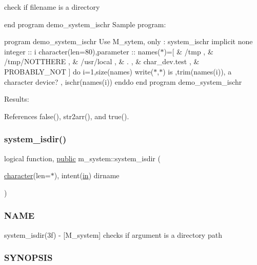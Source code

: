 check if filename is a directory

end program demo\+\_\+system\+\_\+ischr Sample program\+:

program demo\+\_\+system\+\_\+ischr Use M\+\_\+sytem, only \+: system\+\_\+ischr implicit none integer \+:\+: i character(len=80),parameter \+:\+: names($\ast$)=\mbox{[} \& \textquotesingle{}/tmp \textquotesingle{}, \& \textquotesingle{}/tmp/\+N\+O\+T\+T\+H\+E\+RE \textquotesingle{}, \& \textquotesingle{}/usr/local \textquotesingle{}, \& \textquotesingle{}. \textquotesingle{}, \& \textquotesingle{}char\+\_\+dev.\+test \textquotesingle{}, \& \textquotesingle{}P\+R\+O\+B\+A\+B\+L\+Y\+\_\+\+N\+OT \textquotesingle{}\mbox{]} do i=1,size(names) write($\ast$,$\ast$)\textquotesingle{} is \textquotesingle{},trim(names(i)),\textquotesingle{} a character device? \textquotesingle{}, ischr(names(i)) enddo end program demo\+\_\+system\+\_\+ischr

Results\+: 

References false(), str2arr(), and true().

\mbox{\label{namespacem__system_ad097988a031e64b4f21f856cf45c9c73}} 
\subsubsection{\texorpdfstring{system\+\_\+isdir()}{system\_isdir()}}
{\footnotesize\ttfamily logical function, \hyperlink{M__stopwatch_83_8txt_a2f74811300c361e53b430611a7d1769f}{public} m\+\_\+system\+::system\+\_\+isdir (\begin{DoxyParamCaption}\item[{\hyperlink{option__stopwatch_83_8txt_abd4b21fbbd175834027b5224bfe97e66}{character}(len=$\ast$), intent(\hyperlink{M__journal_83_8txt_afce72651d1eed785a2132bee863b2f38}{in})}]{dirname }\end{DoxyParamCaption})}



\subsubsection*{N\+A\+ME}

system\+\_\+isdir(3f) -\/ \mbox{[}M\+\_\+system\mbox{]} checks if argument is a directory path 

\subsubsection*{S\+Y\+N\+O\+P\+S\+IS}

